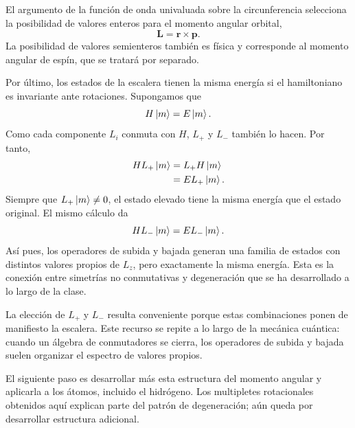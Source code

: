 El argumento de la función de onda univaluada sobre la circunferencia selecciona la posibilidad de valores enteros para el momento angular orbital,
\begin{equation}
\mathbf L=\mathbf r\times\mathbf p.
\end{equation}
La posibilidad de valores semienteros también es física y corresponde al momento angular de espín, que se tratará por separado.

Por último, los estados de la escalera tienen la misma energía si el hamiltoniano es invariante ante rotaciones. Supongamos que
\begin{equation}
H\left\lvert m\right\rangle=E\left\lvert m\right\rangle.
\end{equation}
Como cada componente \(L_i\) conmuta con \(H\), \(L_+\) y \(L_-\) también lo hacen. Por tanto,
\begin{align}
H L_+\left\lvert m\right\rangle
&=L_+H\left\lvert m\right\rangle\\
&=E L_+\left\lvert m\right\rangle.
\end{align}
Siempre que \(L_+\left\lvert m\right\rangle\neq0\), el estado elevado tiene la misma energía que el estado original. El mismo cálculo da
\begin{equation}
H L_-\left\lvert m\right\rangle=E L_-\left\lvert m\right\rangle.
\end{equation}
Así pues, los operadores de subida y bajada generan una familia de estados con distintos valores propios de \(L_z\), pero exactamente la misma energía. Esta es la conexión entre simetrías no conmutativas y degeneración que se ha desarrollado a lo largo de la clase.

\begin{classroomqa}
\end{classroomqa}

La elección de \(L_+\) y \(L_-\) resulta conveniente porque estas combinaciones ponen de manifiesto la escalera. Este recurso se repite a lo largo de la mecánica cuántica: cuando un álgebra de conmutadores se cierra, los operadores de subida y bajada suelen organizar el espectro de valores propios.

\begin{classroomqa}
\end{classroomqa}

El siguiente paso es desarrollar más esta estructura del momento angular y aplicarla a los átomos, incluido el hidrógeno. Los multipletes rotacionales obtenidos aquí explican parte del patrón de degeneración; aún queda por desarrollar estructura adicional.
